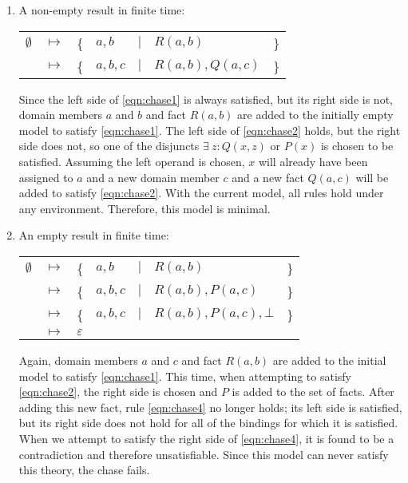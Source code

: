 		\begin{enumerate}
		\item A non-empty result in finite time:

			\begin{tabular}{lllllll}
				$\emptyset$ & $\mapsto$ & \{ & $a,b$   & $|$ & $R(a,b)$         & \} \\
				{}          & $\mapsto$ & \{ & $a,b,c$ & $|$ & $R(a,b), Q(a,c)$ & \}
			\end{tabular}

			Since the left side of \eqref{eqn:chase1} is always satisfied, but its
			right side is not, domain members $a$ and $b$ and fact $R(a,b)$ are
			added to the initially empty model to satisfy \eqref{eqn:chase1}. The
			left side of \eqref{eqn:chase2} holds, but the right side does not, so
			one of the disjuncts $\exists\ z : Q(x,z)$ or $P(x)$ is chosen to
			be satisfied. Assuming the left operand is chosen, $x$ will already
			have been assigned to $a$ and a new domain member $c$ and a new
			fact $Q(a,c)$ will be added to satisfy \eqref{eqn:chase2}. With the
			current model, all rules hold under any environment. Therefore,
			this model is minimal.

		\item An empty result in finite time:

			\begin{tabular}{lllllll}
				$\emptyset$ & $\mapsto$ & \{ & $a,b$   & $|$ & $R(a,b)$               & \} \\
				{}          & $\mapsto$ & \{ & $a,b,c$ & $|$ & $R(a,b), P(a,c)$       & \} \\
				{}          & $\mapsto$ & \{ & $a,b,c$ & $|$ & $R(a,b), P(a,c), \bot$ & \} \\
				{}          & $\mapsto$ & \multicolumn{5}{l}{ $\varepsilon$ }
			\end{tabular}

			Again, domain members $a$ and $c$ and fact $R(a,b)$ are added to
			the initial model to satisfy \eqref{eqn:chase1}. This time, when
			attempting to satisfy \eqref{eqn:chase2}, the right side is chosen and
			$P$ is added to the set of facts. After adding this new fact, rule
			\eqref{eqn:chase4} no longer holds; its left side is satisfied, but its
			right side does not hold for all of the bindings for which it is
			satisfied. When we attempt to satisfy the right side of
			\eqref{eqn:chase4}, it is found to be a contradiction and therefore
			unsatisfiable. Since this model can never satisfy this theory, the
			chase fails.


\end{enumerate}

